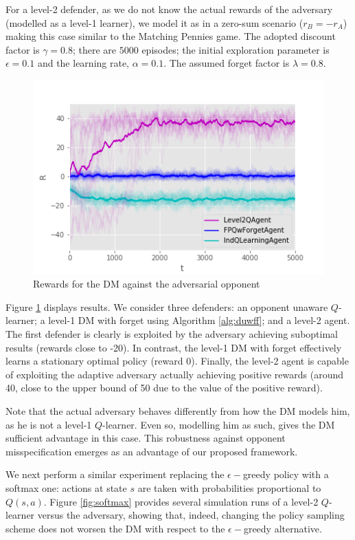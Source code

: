For a level-2 defender, as we do not know 
the actual rewards of the adversary (modelled as a level-1 learner), 
 we  model it as in a zero-sum scenario  ($r_B = -r_A$) making this case similar to the Matching Pennies game. The adopted discount factor is $\gamma = 0.8$;
 there are $5000$ episodes; the initial exploration parameter
 is $\epsilon = 0.1$ and the learning rate, $\alpha = 0.1$. The 
 assumed 
 forget factor is $\lambda = 0.8$.
\begin{figure}%
\centering
\includegraphics[scale=0.5]{figures/4C_08_adversary}%
\caption{Rewards for the DM against the adversarial opponent}\label{fig:4C_adv}
\end{figure}
 Figure \ref{fig:4C_adv} displays results. We consider three defenders:
an opponent unaware $Q$-learner; a level-1 DM with forget
using Algorithm \ref{alg:duwff}; and a
level-2 agent. The first defender is clearly is exploited by the adversary 
achieving suboptimal results (rewards close to -20).
In contrast, the level-1 DM with forget effectively
learns a stationary optimal policy (reward 0). Finally, the
level-2 agent is capable of exploiting 
the adaptive adversary actually achieving positive rewards
(around 40, close to the upper bound of 50 due to the value of the positive reward). 

Note that the actual adversary behaves differently from how the DM models him,
as he is not a level-1 $Q$-learner. Even so, modelling him as 
such, gives the DM sufficient advantage in this case.
This robustness against opponent misspecification emerges as an
advantage of our proposed framework.

We next perform a similar experiment replacing the $\epsilon-$greedy
policy with a softmax one: actions at state $s$ are taken with probabilities 
proportional to $Q(s, a)$. Figure \ref{fig:softmax}
provides several simulation runs of a level-2 $Q$-learner versus the adversary,
showing that, indeed, changing the policy sampling scheme does not worsen
the DM with respect to the $\epsilon-$greedy alternative.

